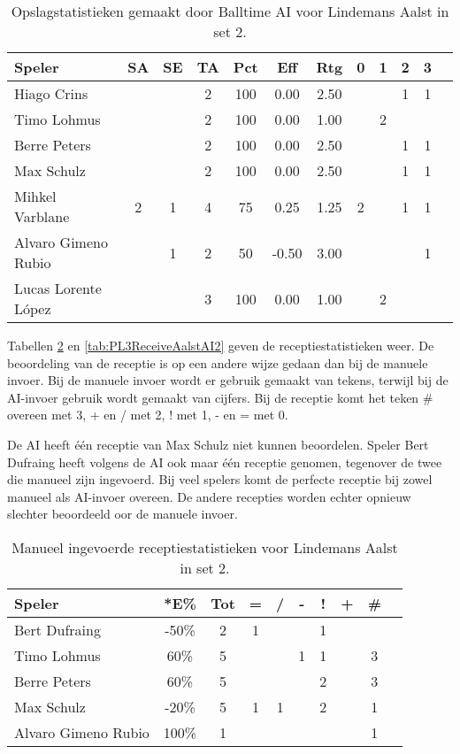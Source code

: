 \begin{table}[ht!]
  \centering
  \scriptsize
  \begin{tabular}{|l|c|c|c|c|c|c|c|c|c|c|c|} \hline
    \textbf{Speler} & SA & SE & TA & Pct & Eff & Rtg & 0 & 1 & 2 & 3  \\ \hline
    Hiago Crins &  &  & 2 & 100 & 0.00 & 2.50 &   &  & 1 & 1  \\
    Timo Lohmus &  &  & 2 & 100 & 0.00 & 1.00 &   & 2 &   &  \\
    Berre Peters &  &  & 2 & 100 & 0.00 & 2.50 &   &  & 1 & 1 \\
    Max Schulz &  &  & 2 & 100 & 0.00 & 2.50 &   &  & 1 & 1 \\
    Mihkel Varblane & 2 & 1 & 4 & 75 & 0.25 & 1.25 & 2 &   & 1 & 1 \\
    Alvaro Gimeno Rubio & & 1 & 2 & 50 & -0.50 & 3.00 &   &  & & 1 \\ 
    Lucas Lorente López &  &  & 3 & 100 & 0.00 & 1.00 &   & 2 &   & \\  \hline
  \end{tabular}
  \caption[Opslagstatistieken gemaakt door Balltime AI voor Lindemans Aalst in set 2]{\label{tab:PL3ServeAalstAI2}Opslagstatistieken gemaakt door Balltime AI voor Lindemans Aalst in set 2.}
\end{table}

Tabellen \ref{tab:PL3ReceiveAalstMan2} en \ref{tab:PL3ReceiveAalstAI2} geven de receptiestatistieken weer. De beoordeling van de receptie is op een andere wijze gedaan dan bij de manuele invoer. Bij de manuele invoer wordt er gebruik gemaakt van tekens, terwijl bij de AI-invoer gebruik wordt gemaakt van cijfers. Bij de receptie komt het teken \# overeen met 3, + en / met 2, ! met 1, - en = met 0.

De AI heeft één receptie van Max Schulz niet kunnen beoordelen. Speler Bert Dufraing heeft volgens de AI ook maar één receptie genomen, tegenover de twee die manueel zijn ingevoerd. Bij veel spelers komt de perfecte receptie bij zowel manueel als AI-invoer overeen. De andere recepties worden echter opnieuw slechter beoordeeld oor de manuele invoer.

\begin{table}[ht!]
    \centering
    \scriptsize
    \begin{tabular}{|l|c|c|c|c|c|c|c|c|c|}
        \hline
        \textbf{Speler} & *E\% & Tot & = & / & - & ! & + & \# \\ \hline
        Bert Dufraing & -50\% & 2 & 1 &  & & 1 &  &  \\ 
        Timo Lohmus & 60\% & 5 &  &  & 1 & 1 & & 3 \\ 
        Berre Peters & 60\% & 5 &  &  &  & 2 & & 3 \\ 
        Max Schulz & -20\% & 5 & 1 & 1 & & 2 &  & 1 \\
        Alvaro Gimeno Rubio & 100\% & 1 &  &  &  & &  & 1 \\ \hline
    \end{tabular}
  \caption[Manueel ingevoerde receptiestatistieken voor Lindemans Aalst in set 2]{\label{tab:PL3ReceiveAalstMan2}Manueel ingevoerde receptiestatistieken voor Lindemans Aalst in set 2.}
\end{table}

